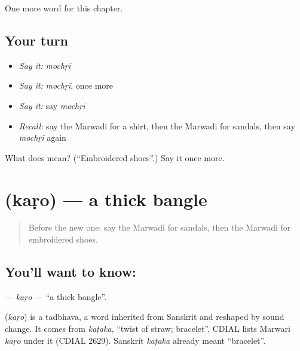 \begin{grammarlens}[title={What you've built}]
One more word for this chapter.
\end{grammarlens}

\subsection*{Your turn}
\begin{itemize}
\raggedright
  \item \emph{Say it:} \emph{mochṛī}
  \item \emph{Say it:} \emph{mochṛī}, once more
  \item \emph{Say it:} say \emph{mochṛī}
  \item \emph{Recall:} say the Marwadi for a shirt, then the Marwadi for sandals, then say \emph{mochṛī} again
\end{itemize}

\begin{tcolorbox}[breakable,colback=teal!4,colframe=teal!35!black,title={Before you move on}]
What does  mean? (\textquotedblleft{}Embroidered shoes\textquotedblright{}.) Say it once more.
\end{tcolorbox}
\section[\texorpdfstring{\mw{कड़ो} (kaṛo)}{कड़ो (kaṛo)}]{ (kaṛo) — a thick bangle}

\label{lesson:MW-C129-karo}



\begin{quote}
Before the new one: say the Marwadi for sandals, then the Marwadi for embroidered shoes.
\end{quote}

\subsection*{You'll want to know: }
\textbf{} — \emph{kaṛo} — \textquotedblleft{}a thick bangle\textquotedblright{}.

\begin{cousinweb}
\textbf{} (\emph{kaṛo}) is a tadbhava, a word inherited from Sanskrit and reshaped by sound change. It comes from \emph{kaṭaka}, \textquotedblleft{}twist of straw; bracelet\textquotedblright{}. CDIAL lists Marwari \emph{kaṛo} under it (CDIAL 2629). Sanskrit \emph{kaṭaka} already meant \textquotedblleft{}bracelet\textquotedblright{}.
\end{cousinweb}

